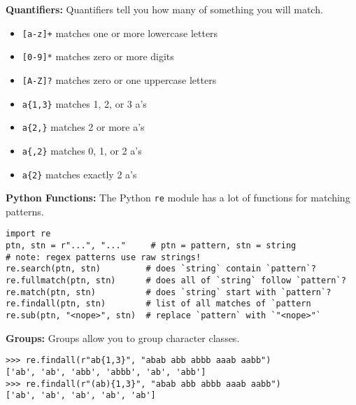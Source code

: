 \textbf{Quantifiers:}
Quantifiers tell you how many of something you will match.
\begin{itemize}
    \item \lstinline$[a-z]+$ matches one or more lowercase letters
    \item \lstinline$[0-9]*$ matches zero or more digits
    \item \lstinline$[A-Z]?$ matches zero or one uppercase letters
    \item \lstinline$a{1,3}$ matches 1, 2, or 3 a's
    \item \lstinline$a{2,}$ matches 2 or more a's
    \item \lstinline$a{,2}$ matches 0, 1, or 2 a's
    \item \lstinline$a{2}$ matches exactly 2 a's
\end{itemize}

\textbf{Python Functions:}
The Python \lstinline$re$ module has a lot of functions for matching patterns.

\begin{lstlisting}
import re
ptn, stn = r"...", "..."     # ptn = pattern, stn = string
# note: regex patterns use raw strings!
re.search(ptn, stn)         # does `string` contain `pattern`?
re.fullmatch(ptn, stn)      # does all of `string` follow `pattern`?
re.match(ptn, stn)          # does `string` start with `pattern`?
re.findall(ptn, stn)        # list of all matches of `pattern
re.sub(ptn, "<nope>", stn)  # replace `pattern` with `"<nope>"`
\end{lstlisting}

\textbf{Groups:}
Groups allow you to group character classes.
\begin{lstlisting}
>>> re.findall(r"ab{1,3}", "abab abb abbb aaab aabb")
['ab', 'ab', 'abb', 'abbb', 'ab', 'abb']
>>> re.findall(r"(ab){1,3}", "abab abb abbb aaab aabb")
['ab', 'ab', 'ab', 'ab', 'ab']
\end{lstlisting}

